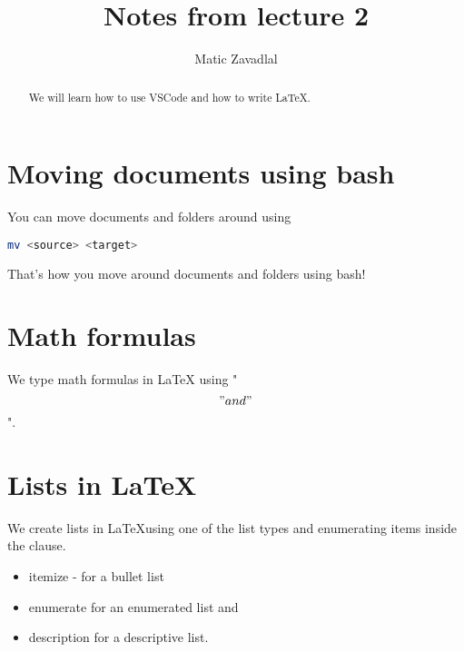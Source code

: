 \documentclass[a4paper]{article}
\begin{document}
\title{Notes from lecture 2}
\author{Matic Zavadlal}

\maketitle

\begin{abstract}
    We will learn how to use VSCode and how to write LaTeX.
\end{abstract}

\section{Moving documents using bash}

You can move documents and folders around using

\begin{lstlisting}[language=Bash]
    mv <source> <target>
\end{lstlisting}

That's how you move around documents and folders using bash! 

\section{Math formulas}

We type math formulas in \LaTeX{} using "\\\[" and "\\\]".

\section{Lists in LaTeX}

We create lists in \LaTeX using one of the list types and enumerating items inside the clause.

\begin{itemize}
    \item itemize - for a bullet list
    \item enumerate for an enumerated list and
    \item description for a descriptive list.
\end{itemize}
\end{document}
